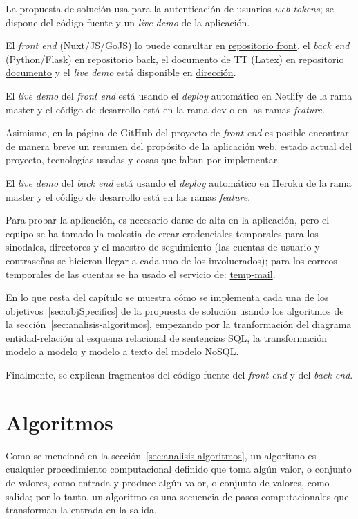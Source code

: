 La propuesta de solución usa para la autenticación de usuarios \textit{web tokens}; se dispone del código fuente y un \textit{live demo} de la aplicación.


El \textit{front end} (Nuxt/JS/GoJS) lo puede consultar en \href{https://github.com/martinez-acosta/TT-2019-B052}{repositorio front}, el \textit{back end} (Python/Flask) en \href{https://github.com/omaraparicio07/api-tt-2019-b052}{repositorio back}, el documento de TT (Latex) en \href{https://github.com/martinez-acosta/DOCS-TT-2019-B052}{repositorio documento} y el \textit{live demo} está disponible en \href{https://serene-haibt-2239b4.netlify.app/}{dirección}.


El \textit{live demo} del \textit{front end} está usando el \textit{deploy} automático en Netlify de la rama master y el código de desarrollo está en la rama dev o en las ramas \textit{feature}.


Asimismo, en la página de GitHub del proyecto de \textit{front end} es posible encontrar de manera breve un resumen del propósito de la aplicación web, estado actual del proyecto, tecnologías usadas y cosas que faltan por implementar.


El \textit{live demo} del \textit{back end} está usando el \textit{deploy} automático en Heroku de la rama master y el código de desarrollo está en las ramas \textit{feature}.


Para probar la aplicación, es necesario darse de alta en la aplicación, pero el equipo se ha tomado la molestia de crear credenciales temporales para los sinodales, directores y el maestro de seguimiento (las cuentas de usuario y contraseñas se hicieron llegar a cada uno de los involucrados); para los correos temporales de las cuentas se ha usado el servicio de: \href{https://temp-mail.org/es/}{temp-mail}.


En lo que resta del capítulo se muestra cómo se implementa cada una de los objetivos~\ref{sec:objSpecifics} de la propuesta de solución usando los algoritmos de la sección~\ref{sec:analisis-algoritmos}, empezando por la tranformación del diagrama entidad-relación al esquema relacional de sentencias SQL, la transformación modelo a modelo y modelo a texto del modelo NoSQL.

Finalmente, se explican fragmentos del código fuente del \textit{front end} y del \textit{back end}. 

\section{Algoritmos}
Como se mencionó en la sección~\ref{sec:analisis-algoritmos}, un algoritmo es cualquier procedimiento computacional definido que toma algún valor, o conjunto de valores, como entrada y produce algún valor, o conjunto de valores, como salida; por lo tanto, un algoritmo es una secuencia de pasos computacionales que transforman la entrada en la salida.


